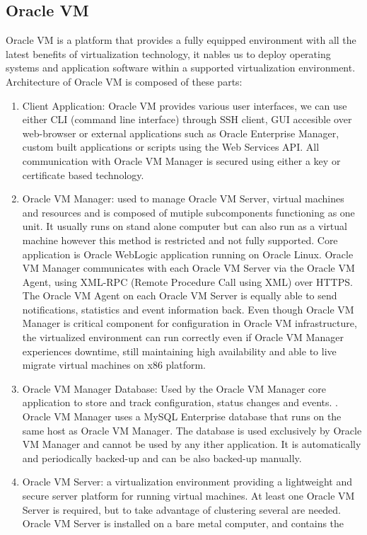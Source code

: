 \subsection{Oracle VM}
Oracle VM is a platform that provides a fully equipped environment with all the latest benefits of virtualization technology, it nables us to deploy operating systems and application software within a supported virtualization environment.
Architecture of Oracle VM is composed of these parts:
\begin{enumerate}
\item Client Application: Oracle VM provides various user interfaces, we can use either CLI (command line interface) through SSH client, GUI accesible over web-browser or external applications such as Oracle Enterprise Manager, custom built applications or scripts using the Web Services API. All communication with Oracle VM Manager is secured using either a key or certificate based technology.
\item Oracle VM Manager: used to manage Oracle VM Server, virtual machines and resources and is composed of mutiple subcomponents functioning as one unit. It usually runs on stand alone computer but can also run as a virtual machine however this method is restricted and not fully supported. Core application is Oracle WebLogic application running on Oracle Linux. Oracle VM Manager communicates with each Oracle VM Server via the Oracle VM Agent, using XML-RPC (Remote Procedure Call using XML) over HTTPS.  The Oracle VM Agent on each Oracle VM Server is equally able to send notifications, statistics and event information back. Even though Oracle VM Manager is critical component for configuration in Oracle VM infrastructure, the virtualized environment can run correctly even if Oracle VM Manager experiences downtime, still maintaining high availability and able to live migrate virtual machines on x86 platform.
\item Oracle VM Manager Database:  Used by the Oracle VM Manager core application to store and track configuration, status changes and events. . Oracle VM Manager uses a MySQL Enterprise database that runs on the same host as Oracle VM Manager. The database is used exclusively by Oracle VM Manager and cannot be used by any ither application. It is automatically and periodically backed-up and can be also backed-up manually.
\item Oracle VM Server: a virtualization environment providing a lightweight and secure server platform for running virtual machines. At least one Oracle VM Server is required, but to take advantage of clustering several are needed. Oracle VM Server is installed on a bare metal computer, and contains the 

\end{enumerate}
